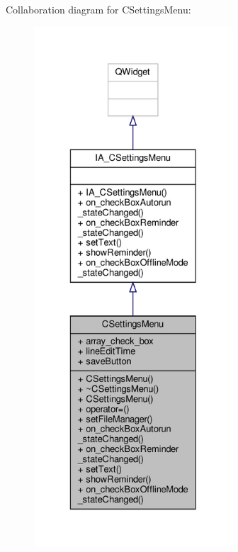 Collaboration diagram for C\+Settings\+Menu\+:
\nopagebreak
\begin{figure}[H]
\begin{center}
\leavevmode
\includegraphics[height=550pt]{classCSettingsMenu__coll__graph}
\end{center}
\end{figure}
